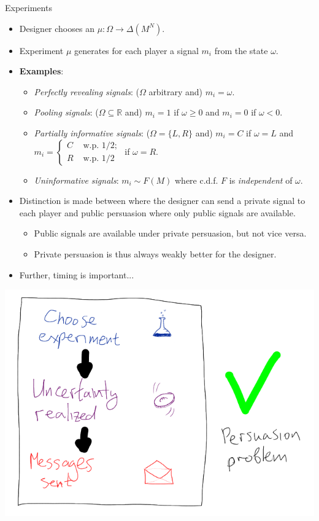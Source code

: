 \documentclass[english,10pt
,aspectratio=169
]{beamer}
\begin{document}
\begin{frame}{Experiments}
\begin{itemize}
	\item Designer chooses an  $\mu: \Omega \to \varDelta(M^N)$.
	\item Experiment $\mu$ generates for each player a signal $m_i$ from the state $\omega$.
	\item \textbf{Examples}:
	\begin{itemize}
		\item \emph{Perfectly revealing signals}: ($\Omega$ arbitrary and) $m_i = \omega$.
		\item \emph{Pooling signals}: ($\Omega \subseteq \mathbb{R}$ and) $m_i = 1$ if $\omega \geq 0$ and $m_i = 0$ if $\omega < 0$.
		\item \emph{Partially informative signals}: ($\Omega=\{L,R\}$ and) $m_i = C$ if $\omega = L$ and $m_i = 
		\begin{cases}
			C & \text{ w.p. }1/2; \\ R & \text{ w.p. }1/2
		\end{cases}$
		if $\omega=R$.
		\item \emph{Uninformative signals}: $m_i \sim F(M)$ where c.d.f. $F$ is \emph{independent} of $\omega$.
	\end{itemize}
	\item Distinction is made between  where the designer can send a private signal to each player and \alert{public persuasion} where only public signals are available.
	\begin{itemize}
		\item Public signals are available under private persuasion, but not vice versa.
		\item Private persuasion is thus always weakly better for the designer.
	\end{itemize}
	\item Further, timing is important...
\end{itemize}
\end{frame}


\begin{frame}
	\centering
	\includegraphics[scale=0.7]{pics/M7/timing1}
\end{frame}
\end{document}
